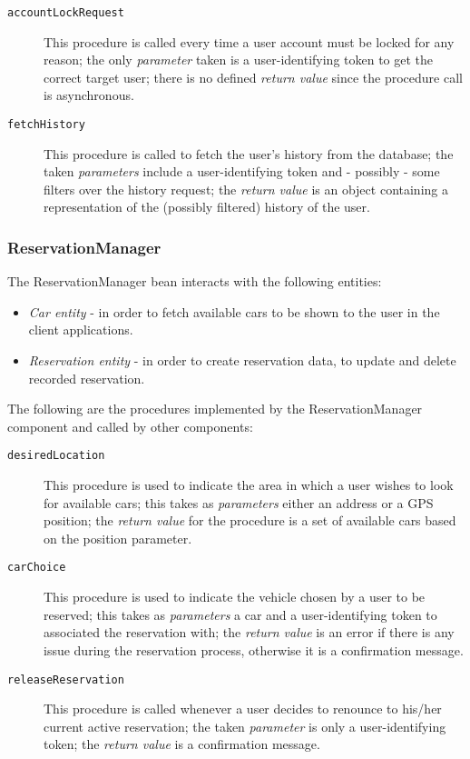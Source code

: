 \begin{description}
\item[\texttt{accountLockRequest}] This procedure is called every time a user account must be locked for any reason; the only \textit{parameter} taken is a user-identifying token to get the correct target user; there is no defined \textit{return value} since the procedure call is asynchronous.
\item[\texttt{fetchHistory}] This procedure is called to fetch the user's history from the database; the taken \textit{parameters} include a user-identifying token and - possibly - some filters over the history request; the \textit{return value} is an object containing a representation of the (possibly filtered) history of the user.
\end{description}
\subsubsection{ReservationManager}
The ReservationManager bean interacts with the following entities:
\begin{itemize}
\item \textit{Car entity} - in order to fetch available cars to be shown to the user in the client applications.
\item \textit{Reservation entity} - in order to create reservation data, to update and delete recorded reservation.
\end{itemize}

The following are the procedures implemented by the ReservationManager component and called by other components:
\begin{description}
\item[\texttt{desiredLocation}] This procedure is used to indicate the area in which a user wishes to look for available cars; this takes as \textit{parameters} either an address or a GPS position; the \textit{return value} for the procedure is a set of available cars based on the position parameter.
\item[\texttt{carChoice}] This procedure is used to indicate the vehicle chosen by a user to be reserved; this takes as \textit{parameters} a car and a user-identifying token to associated the reservation with; the \textit{return value} is an error if there is any issue during the reservation process, otherwise it is a confirmation message.
\item[\texttt{releaseReservation}] This procedure is called whenever a user decides to renounce to his/her current active reservation; the taken \textit{parameter} is only a user-identifying token; the \textit{return value} is a confirmation message.
\end{description}
